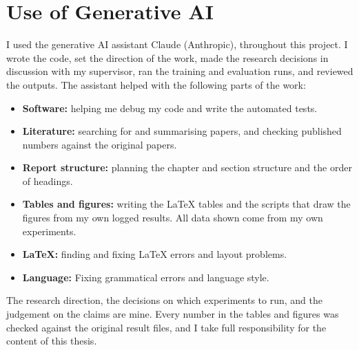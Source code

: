 \documentclass[11pt, a4paper]{report}
\begin{document}
\chapter*{Use of Generative AI}
I used the generative AI assistant Claude (Anthropic), throughout this project. I wrote the code, set the direction of the work, made the research decisions in discussion
with my supervisor, ran the training and evaluation runs, and reviewed the outputs. The assistant helped with
the following parts of the work:
\begin{itemize}
  \item \textbf{Software:} helping me debug my code and write the automated tests.
  \item \textbf{Literature:} searching for and summarising papers, and checking published numbers against the
        original papers.
  \item \textbf{Report structure:} planning the chapter and section structure and the order of headings.
  \item \textbf{Tables and figures:} writing the LaTeX tables and the scripts that draw the figures from my own
        logged results. All data shown come
        from my own experiments.
  \item \textbf{LaTeX:} finding and fixing LaTeX errors and layout problems.
  \item \textbf{Language:} Fixing grammatical errors and language style.
\end{itemize}

The research direction, the decisions on which experiments to run, and the judgement on the claims
are mine. Every number in the tables and figures was checked against the original result files, and I take
full responsibility for the content of this thesis.
\end{document}
